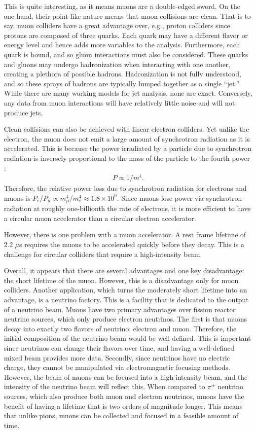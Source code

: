 This is quite interesting, as it means muons are a double-edged sword. On the one hand, their point-like nature means that muon collisions are clean. That is to say, muon colliders have a great advantage over, e.g., proton colliders since protons are composed of three quarks. Each quark may have a different flavor or energy level and hence adds more variables to the analysis. Furthermore, each quark is bound, and so gluon interactions must also be considered. These quarks and gluons may undergo hadronization when interacting with one another, creating a plethora of possible hadrons. Hadronization is not fully understood, and so these sprays of hadrons are typically lumped together as a single ``jet.'' While there are many working models for jet analysis, none are exact. Conversely, any data from muon interactions will have relatively little noise and will not produce jets.

Clean collisions can also be achieved with linear electron colliders. Yet unlike the electron, the muon does not emit a large amount of synchrotron radiation as it is accelerated. This is because the power irradiated by a particle due to synchrotron radiation is inversely proportional to the mass of the particle to the fourth power \cite{griffithsem}:
\begin{align*}
P \propto 1/m^4.
\end{align*}
Therefore, the relative power loss due to synchrotron radiation for electrons and muons is $P_e/P_\mu\propto m_\mu ^4/m_e ^4 \approx 1.8 \times 10^9$. Since muons lose power via synchrotron radiation at roughly one-billionth the rate of electrons, it is more efficient to have a circular muon accelerator than a circular electron accelerator.

However, there is one problem with a muon accelerator. A rest frame lifetime of 2.2 $\mu$s requires the muons to be accelerated quickly before they decay. This is a challenge for circular colliders that require a high-intensity beam.

Overall, it appears that there are several advantages and one key disadvantage: the short lifetime of the muon. However, this is a disadvantage only for muon colliders. Another application, which turns the moderately short lifetime into an advantage, is a neutrino factory. This is a facility that is dedicated to the output of a neutrino beam. Muons have two primary advantages over fission reactor neutrino sources, which only produce electron neutrinos. The first is that muons decay into exactly two flavors of neutrino: electron and muon. Therefore, the initial composition of the neutrino beam would be well-defined. This is important since neutrinos can change their flavors over time, and having a well-defined mixed beam provides more data. Secondly, since neutrinos have no electric charge, they cannot be manipulated via electromagnetic focusing methods. However, the beam of muons can be focused into a high-intensity beam, and the intensity of the neutrino beam will reflect this. When compared to $\pi^\pm$ neutrino sources, which also produce both muon and electron neutrinos, muons have the benefit of having a lifetime that is two orders of magnitude longer. This means that unlike pions, muons can be collected and focused in a feasible amount of time.

